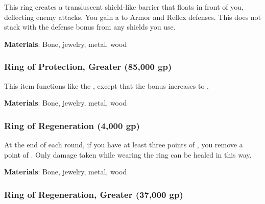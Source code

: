 This ring creates a transluscent shield-like barrier that floats in front of you, deflecting enemy attacks.
You gain a   to Armor and Reflex defenses.
This does not stack with the defense bonus from any shields you use.



\vspace{0.25em}
\textbf{Materials}: Bone, jewelry, metal, wood


\lowercase{\hypertarget{item:Ring of Protection, Greater}{}}\label{item:Ring of Protection, Greater}
\hypertarget{item:Ring of Protection, Greater}{\subsubsection{Ring of Protection, Greater\hfill{} (85,000 gp)}}

This item functions like the , except that the bonus increases to .



\vspace{0.25em}
\textbf{Materials}: Bone, jewelry, metal, wood


\lowercase{\hypertarget{item:Ring of Regeneration}{}}\label{item:Ring of Regeneration}
\hypertarget{item:Ring of Regeneration}{\subsubsection{Ring of Regeneration\hfill{} (4,000 gp)}}

At the end of each round, if you have at least three points of , you remove a point of .
Only damage taken while wearing the ring can be healed in this way.



\vspace{0.25em}
\textbf{Materials}: Bone, jewelry, metal, wood


\lowercase{\hypertarget{item:Ring of Regeneration, Greater}{}}\label{item:Ring of Regeneration, Greater}
\hypertarget{item:Ring of Regeneration, Greater}{\subsubsection{Ring of Regeneration, Greater\hfill{} (37,000 gp)}}

